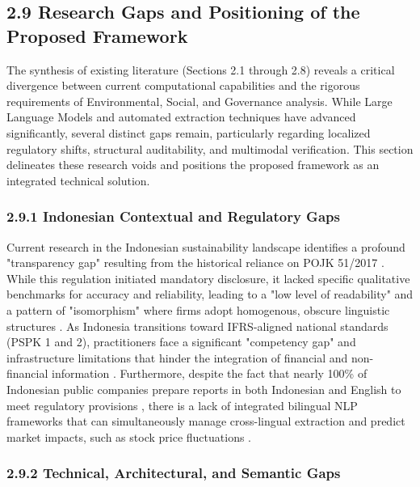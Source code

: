 \documentclass{article}
\begin{document}
\subsection{2.9 Research Gaps and Positioning of the Proposed Framework}



The synthesis of existing literature (Sections 2.1 through 2.8) reveals a critical divergence between current computational capabilities and the rigorous requirements of Environmental, Social, and Governance analysis. While Large Language Models and automated extraction techniques have advanced significantly, several distinct gaps remain, particularly regarding localized regulatory shifts, structural auditability, and multimodal verification. This section delineates these research voids and positions the proposed framework as an integrated technical solution.
\subsubsection{2.9.1 Indonesian Contextual and Regulatory Gaps}

Current research in the Indonesian sustainability landscape identifies a profound "transparency gap" resulting from the historical reliance on POJK 51/2017  \parencite{atika_atika_588ee68a}. While this regulation initiated mandatory disclosure, it lacked specific qualitative benchmarks for accuracy and reliability, leading to a "low level of readability" and a pattern of "isomorphism" where firms adopt homogenous, obscure linguistic structures  \parencite{desi_adhariani_toit_543335d6}. As Indonesia transitions toward IFRS-aligned national standards (PSPK 1 and 2), practitioners face a significant "competency gap" and infrastructure limitations that hinder the integration of financial and non-financial information  \parencite[]{amrie_firmansyah_fd5249a2, amrie_firmansyah_200ee100}. Furthermore, despite the fact that nearly 100\% of Indonesian public companies prepare reports in both Indonesian and English to meet regulatory provisions  \parencite{tri_siwi_nugrahani_056a6914}, there is a lack of integrated bilingual NLP frameworks that can simultaneously manage cross-lingual extraction and predict market impacts, such as stock price fluctuations  \parencite{ubaidillah_ariq_prathama_a1856e2f}.
\subsubsection{2.9.2 Technical, Architectural, and Semantic Gaps}
\end{document}
